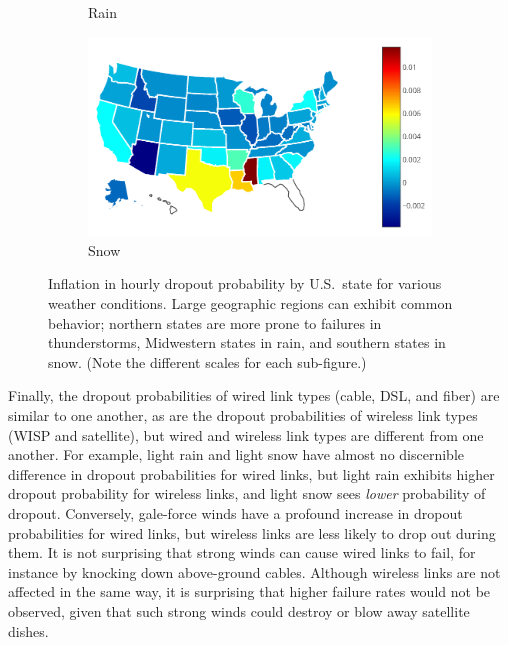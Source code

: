 \begin{figure}[t]
\begin{subfigure}[t]{0.32\linewidth}
\caption{
\label{fig:inflatedfrate_rain_usmap}
	Rain}
\end{subfigure}
%
\begin{subfigure}[t]{0.32\linewidth}
\centering
\includegraphics[width=\linewidth]{weather/figs/normalizedfratebyexclweather_ALL_issnow_statewise_jan11todec17_heatmap}
\caption{
\label{fig:inflatedfrate_snow_usmap}
	Snow}
\end{subfigure}
%
\caption[Inflation in hourly dropout probability by U.S.~state for
various weather conditions]{
\label{fig:inflatedfrate_maps}
\figdone
Inflation in hourly dropout probability by U.S.~state for various
	weather conditions.  Large geographic regions can exhibit common
	behavior; northern states are more prone to failures in
	thunderstorms, Midwestern states in rain, and southern states in
	snow.  (Note the different scales for each sub-figure.)}
\end{figure}


Finally, the dropout probabilities of wired link types (cable, DSL, and
fiber) are similar to one another, as are the dropout probabilities of
wireless link types (WISP and satellite), but wired and wireless link
types are different from one another.
%
For example, light rain and light snow have almost no discernible
difference in dropout probabilities for wired links, but light rain
exhibits higher dropout probability for wireless links, and light snow
sees \emph{lower} probability of dropout.
%
Conversely, gale-force winds have a profound increase in dropout
probabilities for wired links, but wireless links are less likely to
drop out during them.
%
It is not surprising that strong winds can cause wired links to fail,
for instance by knocking down above-ground cables.
%
Although wireless links are not affected in the same way, it is
surprising that higher failure rates would not be observed, given that
such strong winds could destroy or blow away satellite dishes.


